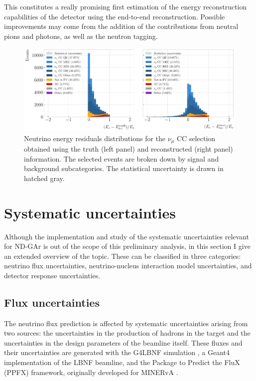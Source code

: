 This constitutes a really promising first estimation of the energy reconstruction capabilities of the detector using the end-to-end reconstruction. Possible improvements may come from the addition of the contributions from neutral pions and photons, as well as the neutron tagging.

\begin{figure}[t]
    \centering
    \includegraphics[width=.99\linewidth]{Images/GAr_selection/numuCC_selection_truth_reco_energy_fresiduals_comparison.pdf}
    \caption[Neutrino energy residuals distributions for the $\nu_{\mu}$ CC selection obtained using the truth and reconstructed information]{Neutrino energy residuals distributions for the $\nu_{\mu}$ CC selection obtained using the truth (left panel) and reconstructed (right panel) information. The selected events are broken down by signal and background subcategories. The statistical uncertainty is drawn in hatched gray.}
    \label{fig:numuCC_reconstructed_fresiduals}
\end{figure}

\section{Systematic uncertainties}
\label{sec:gar_systematics}

Although the implementation and study of the systematic uncertainties relevant for ND-GAr is out of the scope of this preliminary analysis, in this section I give an extended overview of the topic. These can be classified in three categories: neutrino flux uncertainties, neutrino-nucleus interaction model uncertainties, and detector response uncertainties.

\subsection{Flux uncertainties}

The neutrino flux prediction is affected by systematic uncertainties arising from two sources: the uncertainties in the production of hadrons in the target and the uncertainties in the design parameters of the beamline itself. These fluxes and their uncertainties are generated with the G4LBNF simulation \cite{DUNE2020TDR2}, a Geant4 implementation of the LBNF beamline, and the Package to Predict the FluX (PPFX) framework, originally developed for MINERvA \cite{Golan2016}.

